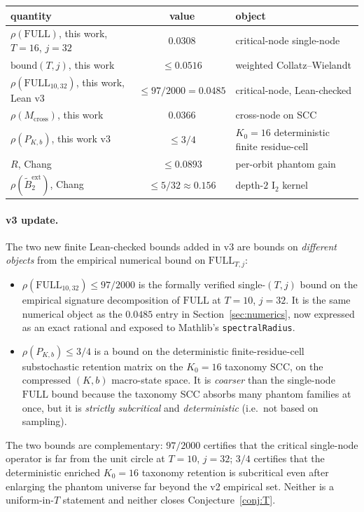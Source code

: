 \documentclass[11pt,a4paper]{article}
\theoremstyle{definition}
\newcommand{\full}{\mathrm{FULL}}
\newcommand{\spec}{\rho}
\begin{document}
\begin{center}
\begin{tabular}{lcl}
\toprule
quantity & value & object \\
\midrule
$\spec(\full)$, this work, $T=16$, $j=32$ & $0.0308$ & critical-node single-node \\
$\mathrm{bound}(T,j)$, this work & $\le 0.0516$ & weighted Collatz--Wielandt \\
$\spec(\full_{10,32})$, this work, Lean v3 & $\le 97/2000 = 0.0485$ &
critical-node, Lean-checked \\
$\spec(M_{\mathrm{cross}})$, this work & $0.0366$ & cross-node on SCC \\
$\spec(P_{K,b})$, this work v3 & $\le 3/4$ &
$K_0 = 16$ deterministic finite residue-cell \\
$R$, Chang \cite[Thm.~7.19]{chang2026} & $\le 0.0893$ & per-orbit phantom gain \\
$\spec(\widetilde{B}_2^{\mathrm{ext}})$, Chang \cite[Thm.~C.3]{chang2026} & $\le 5/32 \approx 0.156$ & depth-$2$ I$_2$ kernel \\
\bottomrule
\end{tabular}
\end{center}

\paragraph{v3 update.}
The two new finite Lean-checked bounds added in v3 are bounds on
\emph{different objects} from the empirical numerical bound on
$\full_{T,j}$:
\begin{itemize}
  \item $\spec(\full_{10,32}) \le 97/2000$ is the formally verified
        single-$(T, j)$ bound on the empirical signature
        decomposition of $\full$ at $T = 10$, $j = 32$. It is the
        same numerical object as the $0.0485$ entry in
        Section~\ref{sec:numerics}, now expressed as an exact
        rational and exposed to Mathlib's \texttt{spectralRadius}.
  \item $\spec(P_{K, b}) \le 3/4$ is a bound on the deterministic
        finite-residue-cell substochastic retention matrix on the
        $K_0 = 16$ taxonomy SCC, on the compressed $(K, b)$
        macro-state space. It is \emph{coarser} than the single-node
        $\full$ bound because the taxonomy SCC absorbs many phantom
        families at once, but it is \emph{strictly subcritical} and
        \emph{deterministic} (i.e.\ not based on sampling).
\end{itemize}
The two bounds are complementary: $97/2000$ certifies that the
critical single-node operator is far from the unit circle at
$T = 10$, $j = 32$; $3/4$ certifies that the deterministic enriched
$K_0 = 16$ taxonomy retention is subcritical even after enlarging
the phantom universe far beyond the v2 empirical set. Neither is a
uniform-in-$T$ statement and neither closes
Conjecture~\ref{conj:T}.
\end{document}
